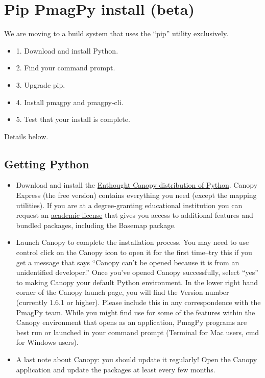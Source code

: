 \documentclass[11pt]{book}
\begin{document}
{%

 \section{Pip PmagPy install (beta)}
 We are moving to a build system that uses the ``pip'' utility exclusively.

 \begin{itemize}
   \item 1.  Download and install Python.
   \item 2.  Find your command prompt.
   \item 3.  Upgrade pip.
   \item 4.  Install pmagpy and pmagpy-cli.
   \item 5.  Test that your install is complete.
 \end{itemize} 

 Details below.
  \subsection{Getting Python}
  \begin{itemize}
  \item Download and install the \href{https://www.enthought.com/products/canopy/}{Enthought Canopy distribution of Python}. Canopy Express (the free version) contains everything you need (except the mapping utilities). If you are at a degree-granting educational institution you can request an \href{https://www.enthought.com/products/canopy/academic/}{academic license} that gives you access to additional features and bundled packages, including the Basemap package.
   \item Launch Canopy to complete the installation process.  You may need to use control click on the Canopy icon to open it for the first time--try this if you get a message that says ``Canopy can't be opened because it is from an unidentified developer.''  Once you've opened Canopy successfully, select ``yes'' to making Canopy your default Python environment.  In the lower right hand corner of the Canopy launch page, you will find the Version number (currently 1.6.1 or higher). Please include this in any correspondence with the PmagPy team. While you might find use for some of the features within the Canopy environment that opens as an application, PmagPy programs are best run or launched in your command prompt (Terminal for Mac users, cmd for Windows users).
   \item A last note about Canopy: you should update it regularly!  Open the Canopy application and update the packages at least every few months.
   \end{itemize}


}
\end{document}
